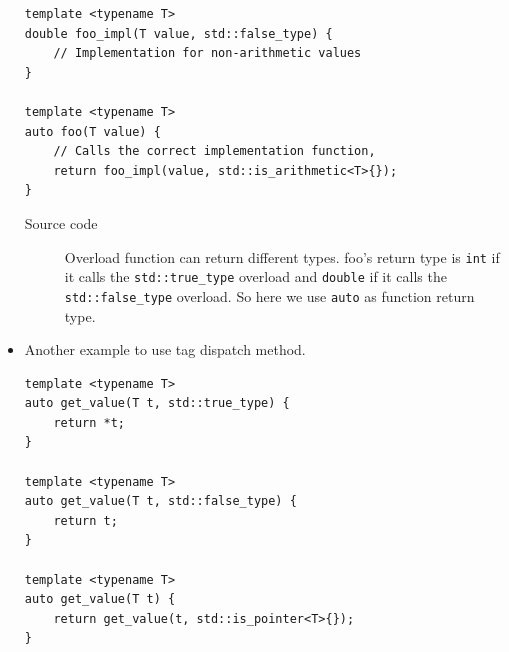\documentclass[a4paper,11pt,twoside]{book}
\begin{document}
\begin{itemize}
\begin{lstlisting}[numbers=none]
template <typename T>
double foo_impl(T value, std::false_type) {
	// Implementation for non-arithmetic values
}

template <typename T>
auto foo(T value) {
	// Calls the correct implementation function, 
	return foo_impl(value, std::is_arithmetic<T>{});
}
\end{lstlisting}
\begin{description}
	\item[Source code] Overload function can return different types. foo's return type is \texttt{int} if it calls the \texttt{std::true\_type} overload and \texttt{double} if it calls the \texttt{std::false\_type} overload. So here we use \texttt{auto} as function return type.
\end{description}

\item Another example to use tag dispatch method.
	
\begin{lstlisting}[numbers=none]
template <typename T>
auto get_value(T t, std::true_type) {
	return *t;
}

template <typename T>
auto get_value(T t, std::false_type) {
	return t;
}

template <typename T>
auto get_value(T t) {
	return get_value(t, std::is_pointer<T>{}); 
}
\end{lstlisting}	
\end{itemize}
\end{document}
